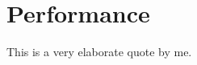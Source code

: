 %
%
% 
% 

\chapter{Performance}

\label{chap:Performance}

\begin{displayquote}
  This is a very elaborate quote by me.
\end{displayquote}
